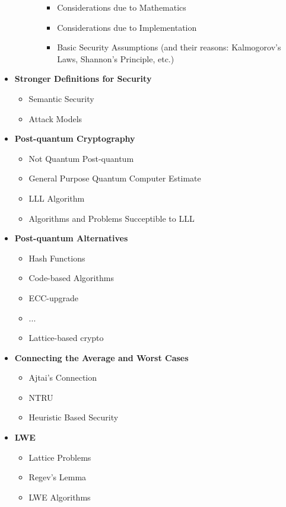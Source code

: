 \documentclass{report}
\begin{document}
\begin{itemize}
\begin{itemize}
\begin{itemize}
\begin{itemize}
							\item Considerations due to Mathematics
							\item Considerations due to Implementation
							\item Basic Security Assumptions (and their reasons: Kalmogorov's Laws, Shannon's Principle, etc.)								\end{itemize}
						\end{itemize}
				\end{itemize}
			\item \textbf{Stronger Definitions for Security}
				\begin{itemize}
					\item Semantic Security
					\item Attack Models
				\end{itemize}
			\item \textbf{Post-quantum Cryptography}
				\begin{itemize}
					\item Not Quantum Post-quantum
					\item General Purpose Quantum Computer Estimate
					\item LLL Algorithm
					\item Algorithms and Problems Succeptible to LLL
				\end{itemize}
			\item \textbf{Post-quantum Alternatives}
				\begin{itemize}
					\item Hash Functions
					\item Code-based Algorithms
					\item ECC-upgrade
					\item ...
					\item Lattice-based crypto
				\end{itemize}
			\item \textbf{Connecting the Average and Worst Cases}
				\begin{itemize}
					\item Ajtai's Connection
					\item NTRU
					\item Heuristic Based Security
				\end{itemize}
			\item \textbf{LWE}
				\begin{itemize}
					\item Lattice Problems
					\item Regev's Lemma
					\item LWE Algorithms

\end{itemize}
\end{itemize}
\end{document}
